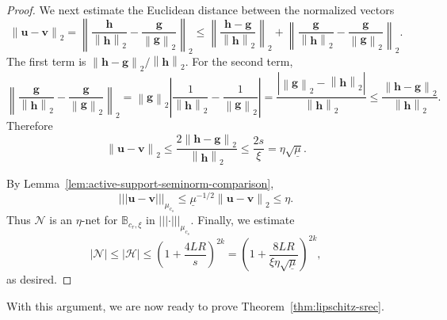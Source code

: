 \documentclass{article}
\theoremstyle{plain}
\theoremstyle{definition}
\theoremstyle{remark}
\newcommand*{\snorm}[2]{\left\vert\!\left\vert\!\left\vert #1 \right\vert\!\right\vert\!\right\vert_{#2}}
\begin{document}
\begin{proof}
We next estimate the Euclidean distance between the normalized vectors
\[
 \left\|\mathbf u-\mathbf v\right\|_2 = 
  \left\|
    \frac{\mathbf h}{\left\|\mathbf h\right\|_2}
    -
    \frac{\mathbf g}{\left\|\mathbf g\right\|_2}
  \right\|_2
  \leq
  \left\|
    \frac{\mathbf h-\mathbf g}{\left\|\mathbf h\right\|_2}
  \right\|_2
  +
  \left\|
    \frac{\mathbf g}{\left\|\mathbf h\right\|_2}
    -
    \frac{\mathbf g}{\left\|\mathbf g\right\|_2}
  \right\|_2.
\]
The first term is $\left\|\mathbf h-\mathbf g\right\|_2/\left\|\mathbf h\right\|_2$.
For the second term,
\[
  \left\|
    \frac{\mathbf g}{\left\|\mathbf h\right\|_2}
    -
    \frac{\mathbf g}{\left\|\mathbf g\right\|_2}
  \right\|_2
  =
  \left\|\mathbf g\right\|_2
  \left|
    \frac{1}{\left\|\mathbf h\right\|_2}
    -
    \frac{1}{\left\|\mathbf g\right\|_2}
  \right|
  =
  \frac{\left|\left\|\mathbf g\right\|_2-\left\|\mathbf h\right\|_2\right|}
       {\left\|\mathbf h\right\|_2}
  \leq
  \frac{\left\|\mathbf h-\mathbf g\right\|_2}{\left\|\mathbf h\right\|_2}.
\]
Therefore
\[
  \left\|\mathbf u-\mathbf v\right\|_2
  \leq
  \frac{2\left\|\mathbf h-\mathbf g\right\|_2}{\left\|\mathbf h\right\|_2}
  \leq
  \frac{2s}{\xi}
  =
  \eta\sqrt{\underline{\mu}}.
\]

By Lemma~\ref{lem:active-support-seminorm-comparison},
\[
  \snorm{\mathbf u-\mathbf v}{\mu_{c_s}}
  \leq
  \underline{\mu}^{-1/2}
  \left\|\mathbf u-\mathbf v\right\|_2
  \leq
  \eta.
\]
Thus $\mathcal N$ is an $\eta$-net for $\mathbb B_{c_r,\xi}$ in
$\snorm{\cdot}{\mu_{c_s}}$. Finally, we estimate
\[
  \left|\mathcal N\right|
  \leq
  \left|\mathcal H\right|
  \leq
  \left(
    1+
    \frac{4LR}{s}
  \right)^{2k}
  =
  \left(
    1+
    \frac{8LR}
         {\xi\eta\sqrt{\underline{\mu}}}
  \right)^{2k},
\]
as desired.
\end{proof}

 With this argument, we are now ready to prove Theorem~\ref{thm:lipschitz-srec}.
\end{document}
